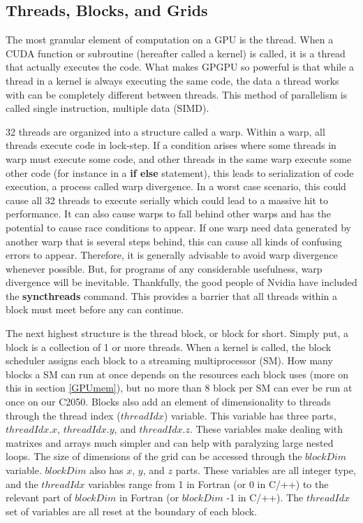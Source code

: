 \documentclass[12pt]{book}
\newcommand{\comm}[1]{\textbf{#1}}
\begin{document}
\subsection{Threads, Blocks, and Grids}\label{ThBlGr}
The most granular element of computation on a GPU is the thread. When a CUDA function or subroutine (hereafter called a kernel) is called, it is a thread that actually executes the code. What makes GPGPU so powerful is that while a thread in a kernel is always executing the same code, the data a thread works with can be completely different between threads. This method of parallelism is called single instruction, multiple data (SIMD). 

32 threads are organized into a structure called a warp. Within a warp, all threads execute code in lock-step. If a condition arises where some threads in warp must execute some code, and other threads in the same warp execute some other code (for instance in a \textbf{if else} statement), this leads to serialization of code execution, a process called warp divergence. In a worst case scenario, this could cause all 32 threads to execute serially which could lead to a massive hit to performance. It can also cause warps to fall behind other warps and has the potential to cause race conditions to appear. If one warp need data generated by another warp that is several steps behind, this can cause all kinds of confusing errors to appear. Therefore, it is generally advisable to avoid warp divergence whenever possible. But, for programs of any considerable usefulness, warp divergence will be inevitable. Thankfully, the good people of Nvidia have included the \comm{syncthreads} command. This provides a barrier that all threads within a block must meet before any can continue. 

The next highest structure is the thread block, or block for short. Simply put, a block is a collection of 1 or more threads. When a kernel is called, the block scheduler assigns each block to a streaming multiprocessor (SM). How many blocks a SM can run at once depends on the resources each block uses (more on this in section \ref{GPUmem}), but no more than 8 block per SM can ever be run at once on our C2050. Blocks also add an element of dimensionality to threads through the thread index ($threadIdx$) variable. This variable has three parts, $threadIdx.x$, $threadIdx.y$, and $threadIdx.z$. These variables make dealing with matrixes and arrays much simpler and can help with paralyzing large nested loops. The size of dimensions of the grid can be accessed through the $blockDim$ variable. $blockDim$ also has $x$, $y$, and $z$ parts. These variables are all integer type, and the $threadIdx$ variables range from 1 in Fortran (or 0 in C/++) to the relevant part of $blockDim$ in Fortran (or $blockDim$ -1 in C/++). The $threadIdx$ set of variables are all reset at the boundary of each block. 
\end{document}
